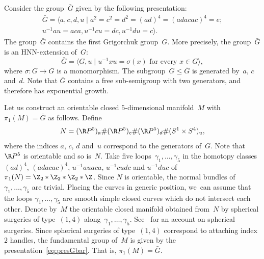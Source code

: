 Consider the group~$\bar{G}$ given by the following presentation:
\begin{multline} \label{eq:presGbar}
\bar{G} = \bigl\langle a,c,d,u \mid a^2 = c^2 = d^2 = (ad)^4 = (adacac)^4 = e ;\\ u^{-1} a u = aca, u^{-1}c u=dc, u^{-1}d u = c \bigr\rangle.
\end{multline}
The group~$\bar{G}$ contains the first Grigorchuk group~$G$. More precisely, the group~$\bar{G}$ is an HNN-extension of~$G$:
\[
\bar{G} = \bigl\langle G,u \mid u^{-1} x u = \sigma(x) \mbox{ for every } x \in G \bigr\rangle,
\]
where $\sigma: G \to G$ is a monomorphism. The subgroup~$G \leqslant \bar{G}$ is generated by~$a$, $c$ and~$d$.
Note that $\bar{G}$ contains a free sub-semigroup with two generators, and therefore has exponential growth.

Let us construct an orientable closed $5$-dimensional manifold~$M$ with $\pi_1(M)=\bar{G}$ as follows.
Define
\begin{equation} \label{eq:connectedsum}
N = (\R P^5)_a \# (\R P^5)_c \# (\R P^5)_d \# (S^1 \times S^4)_u,
\end{equation}
where the indices $a$, $c$, $d$ and~$u$ correspond to the generators of~$G$.
Note that $\R P^5$ is orientable and so is~$N$.
Take five loops~$\gamma_1,\dots,\gamma_5$ in the homotopy classes $(ad)^4$, $(adacac)^4$, $u^{-1} a u aca$, $u^{-1}c udc$ and $u^{-1}d uc$ of $\pi_1(N) = \Z_2 * \Z_2 * \Z_2 * \Z$.
Since $N$ is orientable, the normal bundles of~$\gamma_1,\dots,\gamma_5$ are trivial.
Placing the curves in generic position, we~can assume that the loops $\gamma_1,\dots,\gamma_5$ are smooth simple closed curves which do not intersect each other.
Denote by~$M$ the orientable closed manifold obtained from~$N$ by spherical surgeries of type~$(1,4)$ along~$\gamma_1,\dots,\gamma_5$.
See~\cite[\S3]{Milnor61} for an account on spherical surgeries.
Since spherical surgeries of type~$(1,4)$ correspond to attaching index~$2$ handles, the fundamental group of~$M$ is given by the presentation~\eqref{eq:presGbar}.
That is, $\pi_1(M) = \bar{G}$.

